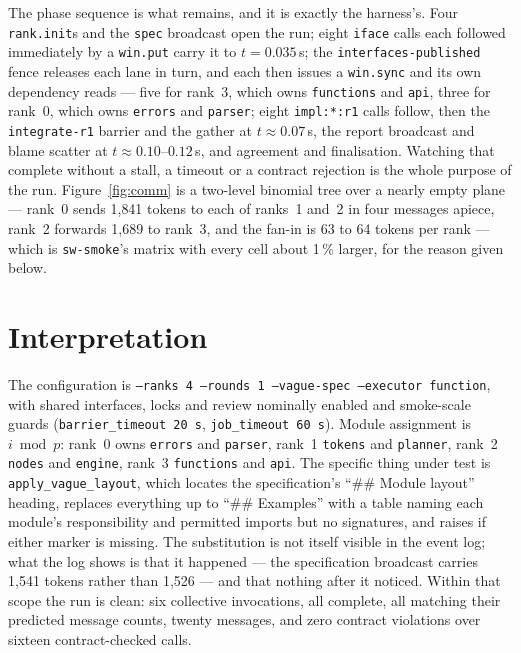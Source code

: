 \documentclass[11pt]{article}
\begin{document}
The phase sequence is what remains, and it is exactly the harness's. Four \texttt{rank.init}s
and the \texttt{spec} broadcast open the run; eight \texttt{iface} calls each followed
immediately by a \texttt{win.put} carry it to $t = 0.035$\,s; the
\texttt{interfaces-published} fence releases each lane in turn, and each then issues a
\texttt{win.sync} and its own dependency reads --- five for rank~3, which owns
\texttt{functions} and \texttt{api}, three for rank~0, which owns \texttt{errors} and
\texttt{parser}; eight \texttt{impl:*:r1} calls follow, then the \texttt{integrate-r1} barrier
and the gather at $t \approx 0.07$\,s, the report broadcast and blame scatter at
$t \approx 0.10$--$0.12$\,s, and agreement and finalisation. Watching that complete without a
stall, a timeout or a contract rejection is the whole purpose of the run.
Figure~\ref{fig:comm} is a two-level binomial tree over a nearly empty plane --- rank~0 sends
1{,}841 tokens to each of ranks~1 and~2 in four messages apiece, rank~2 forwards 1{,}689 to
rank~3, and the fan-in is 63 to 64 tokens per rank --- which is \texttt{sw-smoke}'s matrix with
every cell about 1\,\% larger, for the reason given below.

\section{Interpretation}

The configuration is \texttt{--ranks 4 --rounds 1 --vague-spec --executor function}, with
shared interfaces, locks and review nominally enabled and smoke-scale guards
(\texttt{barrier\_timeout 20\,s}, \texttt{job\_timeout 60\,s}). Module assignment is
$i \bmod p$: rank~0 owns \texttt{errors} and \texttt{parser}, rank~1 \texttt{tokens} and
\texttt{planner}, rank~2 \texttt{nodes} and \texttt{engine}, rank~3 \texttt{functions} and
\texttt{api}. The specific thing under test is \texttt{apply\_vague\_layout}, which locates the
specification's ``\#\# Module layout'' heading, replaces everything up to ``\#\# Examples''
with a table naming each module's responsibility and permitted imports but no signatures, and
raises if either marker is missing. The substitution is not itself visible in the event log;
what the log shows is that it happened --- the specification broadcast carries 1{,}541 tokens
rather than 1{,}526 --- and that nothing after it noticed. Within that scope the run is clean:
six collective invocations, all complete, all matching their predicted message counts, twenty
messages, and zero contract violations over sixteen contract-checked calls.
\end{document}
